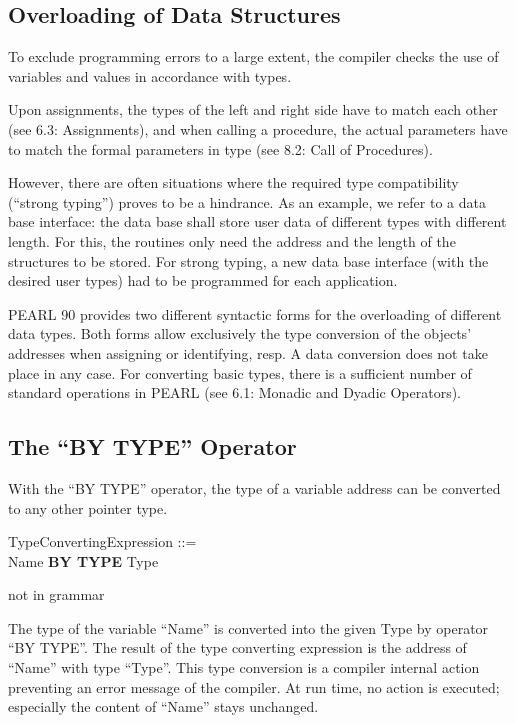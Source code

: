 \begin{removed}
\section{Overloading of Data Structures}   %

To exclude programming errors to a large extent, the compiler checks the
use of variables and values in accordance with types.

Upon assignments, the types of the left and right side have to match
each other (see 6.3: Assignments), and when calling a procedure, the
actual parameters have to match the formal parameters in type (see 8.2:
Call of Procedures).

However, there are often situations where the required type
compatibility (``strong typing'') proves to be a hindrance. As an
example, we refer to a data base interface: the data base shall store
user data of different types with different length. For this, the
routines only need the address and the length of the structures to be
stored. For strong typing, a new data base interface (with the desired
user types) had to be programmed for each application.

PEARL 90 provides two different syntactic forms for the overloading of
different data types. Both forms allow exclusively the type conversion
of the objects' addresses when assigning or identifying, resp. A data
conversion does not take place in any case. For converting basic types,
there is a sufficient number of standard operations in PEARL (see 6.1:
Monadic and Dyadic Operators).

\subsection{The ``BY TYPE'' Operator} %

With the ``BY TYPE'' operator, the type of a variable address can be
converted to any other pointer type.

\begin{front}
TypeConvertingExpression ::=\\
\x Name {\bf BY TYPE} Type
\end{front}
\begin{grammar}
not in grammar
\end{grammar}

The type of the variable ``Name'' is converted into the given Type by
operator ``BY TYPE''. The result of the type converting expression is
the address of ``Name'' with type ``Type''. This type conversion is a
compiler internal action preventing an error message of the compiler. At
run time, no action is executed; especially the content of ``Name''
stays unchanged.
\end{removed}
